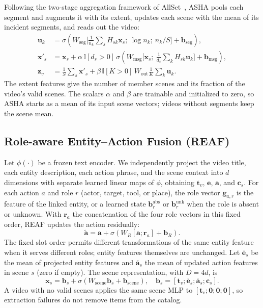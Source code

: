 Following the two-stage aggregation framework of AllSet~\cite{chien2022allset}, ASHA pools each segment and augments it with its extent, updates each scene with the mean of its incident segments, and reads out the video:
\begin{align}
  \mathbf{u}_k &= \sigma\!\left(W_{\mathrm{seg}}\big[\tfrac{1}{n_k}\textstyle\sum_s H_{sk}\mathbf{x}_s;\ \log n_k;\ n_k/S\big]+\mathbf{b}_{\mathrm{seg}}\right), \label{eq:segment}\\
  \mathbf{x}'_s &= \mathbf{x}_s+\alpha\,\mathbb{I}[d_s>0]\,\sigma\!\left(W_{\mathrm{msg}}\big[\mathbf{x}_s;\ \tfrac{1}{d_s}\textstyle\sum_k H_{sk}\mathbf{u}_k\big]+\mathbf{b}_{\mathrm{msg}}\right), \label{eq:scene-update}\\
  \mathbf{z}_v &= \tfrac{1}{S}\textstyle\sum_s\mathbf{x}'_s+\beta\,\mathbb{I}[K>0]\,W_{\mathrm{out}}\tfrac{1}{K}\textstyle\sum_k\mathbf{u}_k. \label{eq:video-readout}
\end{align}
The extent features give the number of member scenes and its fraction of the video's valid scenes.
The scalars $\alpha$ and $\beta$ are trainable and initialized to zero, so ASHA starts as a mean of its input scene vectors; videos without segments keep the scene mean.

\subsection{Role-aware Entity--Action Fusion (REAF)}
\label{sec:reaf}
Let $\phi(\cdot)$ be a frozen text encoder.
We independently project the video title, each entity description, each action phrase, and the scene context into $d$ dimensions with separate learned linear maps of $\phi$, obtaining $\mathbf{t}_v$, $\mathbf{e}$, $\mathbf{a}$, and $\mathbf{c}_s$.
For each action $a$ and role $r$ (actor, target, tool, or place), the role vector $\mathbf{g}_{a,r}$ is the feature of the linked entity, or a learned state $\mathbf{b}_r^{\mathrm{abs}}$ or $\mathbf{b}_r^{\mathrm{unk}}$ when the role is absent or unknown.
With $\mathbf{r}_a$ the concatenation of the four role vectors in this fixed order, REAF updates the action residually:
\begin{equation}
  \widetilde{\mathbf{a}}=\mathbf{a}+\sigma\!\left(W_R[\mathbf{a};\mathbf{r}_a]+\mathbf{b}_R\right).
  \label{eq:reaf}
\end{equation}
The fixed slot order permits different transformations of the same entity feature when it serves different roles; entity features themselves are unchanged.
Let $\overline{\mathbf{e}}_s$ be the mean of projected entity features and $\overline{\mathbf{a}}_s$ the mean of updated action features in scene $s$ (zero if empty).
The scene representation, with $D=4d$, is
\begin{equation}
  \mathbf{x}_s=\mathbf{b}_s+\sigma(W_{\mathrm{scene}}\mathbf{b}_s+\mathbf{b}_{\mathrm{scene}}),\quad
  \mathbf{b}_s=[\mathbf{t}_v;\overline{\mathbf{e}}_s;\overline{\mathbf{a}}_s;\mathbf{c}_s].
  \label{eq:scene-encoder}
\end{equation}
A video with no valid scenes applies the same scene MLP to $[\mathbf{t}_v;\mathbf{0};\mathbf{0};\mathbf{0}]$, so extraction failures do not remove items from the catalog.


